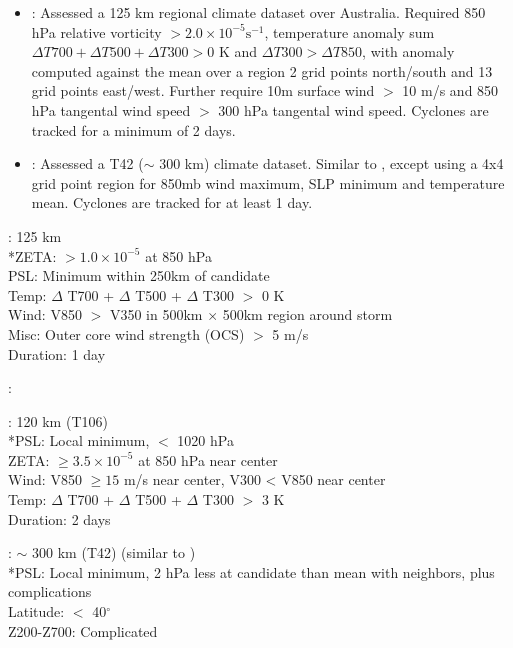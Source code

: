 \documentclass[gmdd, hvmath, online]{copernicus_discussions}
\begin{document}
\begin{itemize}
\item \cite{walsh1997objective, walsh1997tropical}:  Assessed a 125 km regional climate dataset over Australia.  Required 850 hPa relative vorticity $> 2.0 \times 10^{-5} \mbox{s}^{-1}$, temperature anomaly sum $\Delta T700+ \Delta T500+ \Delta T300 > 0$ K and $\Delta T300 > \Delta T850$, with anomaly computed against the mean over a region 2 grid points north/south and 13 grid points east/west.  Further require 10m surface wind $>$ 10 m/s and 850 hPa tangental wind speed $>$ 300 hPa tangental wind speed.  Cyclones are tracked for a minimum of 2 days.

\item \cite{krishnamurti1998impact}:  Assessed a T42 ($\sim$ 300 km) climate dataset.  Similar to \cite{bengtsson1995hurricane, bengtsson1996will}, except using a 4x4 grid point region for 850mb wind maximum, SLP minimum and temperature mean.  Cyclones are tracked for at least 1 day.
\end{itemize}

\cite{nguyen2001interannual}: 125 km \\
*ZETA:  $> 1.0 \times 10^{-5}$ at 850 hPa \\
PSL:  Minimum within 250km of candidate \\
Temp:  $\Delta$ T700 + $\Delta$ T500 + $\Delta$ T300 $>$ 0 K \\
Wind:  V850 $>$ V350 in 500km $\times$ 500km region around storm \\
Misc:  Outer core wind strength (OCS) $>$ 5 m/s \\
Duration:  1 day

\cite{vitart2001sensitivity}:  

\cite{sugi2002influence}:  120 km (T106) \\
*PSL:  Local minimum, $<$ 1020 hPa \\
ZETA:  $\geq 3.5 \times 10^{-5}$ at 850 hPa near center \\
Wind:  V850 $\geq 15$ m/s near center, V300 < V850 near center \\
Temp:  $\Delta$ T700 + $\Delta$ T500 + $\Delta$ T300 $>$ 3 K \\
Duration:  2 days

\cite{tsutsui2002implications}:  $\sim$ 300 km (T42) (similar to \cite{tsutsui1996simulated}) \\
*PSL:  Local minimum, 2 hPa less at candidate than mean with neighbors, plus complications \\
Latitude:  $<$ 40$^\circ$ \\
Z200-Z700:  Complicated
\end{document}
